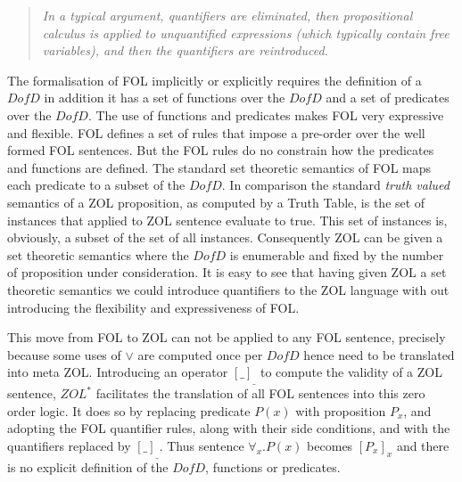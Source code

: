  


\begin{quotation}
\emph{In a typical argument, quantifiers are eliminated, then propositional calculus is applied to unquantified expressions (which typically contain free variables), and then the quantifiers are reintroduced.}
\end{quotation}

The formalisation of FOL implicitly or explicitly requires the definition of a $DofD$ in addition it has a set of functions over the $DofD$ and a set of predicates over the $DofD$. The use of functions and predicates makes FOL very expressive and flexible.
FOL defines a set of rules that impose a pre-order over the  well formed FOL sentences. But the FOL rules do no constrain  how the predicates and functions are defined. The standard set theoretic semantics of FOL maps each predicate to a subset of the $DofD$. In comparison the standard \emph{truth valued} semantics of a ZOL proposition, as computed by a Truth Table, is the set of instances that applied to ZOL sentence evaluate to true. This set of instances is, obviously, a subset of the set of all instances. Consequently ZOL can be given a set theoretic semantics where  the $DofD$ is enumerable and fixed by the number of proposition under consideration. It is easy to see that having given ZOL a set theoretic semantics we could introduce quantifiers to the ZOL language with out introducing the flexibility and expressiveness of FOL.



This move from FOL to ZOL can not be applied to any FOL sentence, precisely because some uses of $\vee$ are computed once per $DofD$ hence need to be translated into meta ZOL.  Introducing an operator $[\_]_{\_}$ to compute the validity of a ZOL sentence, $ZOL^*$ facilitates the translation of all FOL sentences into this zero order logic. It does so by replacing predicate $P(x)$ with proposition $P_x$, and adopting  the FOL quantifier rules, along with their side conditions,  and with the quantifiers replaced by $[\_]_{\_}$. Thus  sentence $\forall_x.P(x)$ becomes $[P_x]_x$
 and there is no explicit definition of the $DofD$, functions or predicates.




